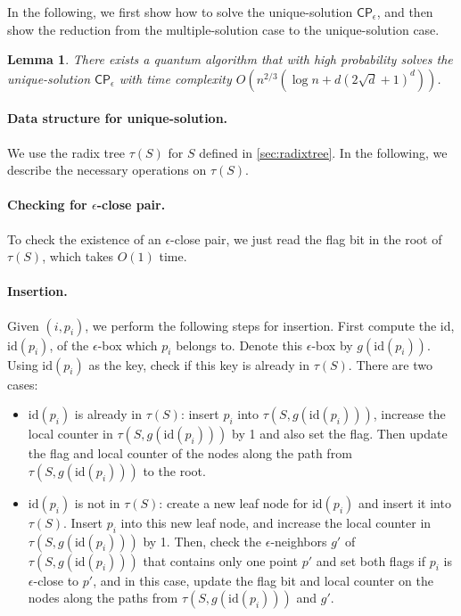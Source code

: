\documentclass[10pt,a4paper]{article}
\newtheorem{lemma}[theorem]{Lemma}
\newcommand{\id}{\mathrm{id}}
\newcommand{\eCP}{\mathsf{CP}_{\epsilon}}
\begin{document}
In the following, we first show how to solve the unique-solution $\eCP$, and then show the reduction from the multiple-solution case to the unique-solution case. 
\begin{lemma}
  \label{lem:ecp-single-solution}
  There exists a quantum algorithm that with high probability solves the unique-solution $\eCP$ with time complexity $O(n^{2/3}(\log n + d(2\sqrt{d}+1)^d))$.
\end{lemma}


\paragraph{Data structure for unique-solution.}

We use the radix tree $\tau(S)$ for $S$ defined in \cref{sec:radixtree}. In the following, we describe the necessary operations on $\tau(S)$.

\paragraph{Checking for $\epsilon$-close pair.} To check the existence of an $\epsilon$-close pair, we just read the flag bit in the root of $\tau(S)$, which takes $O(1)$ time.

\paragraph{Insertion.} Given $(i, p_i)$, we perform the following steps for insertion. First compute the id, $\id(p_i)$, of the $\epsilon$-box which $p_i$ belongs to. Denote this $\epsilon$-box by $g(\id(p_i))$. Using $\id(p_i)$ as the key, check if this key is already in $\tau(S)$. There are two cases:
\begin{itemize}
  \item $\id(p_i)$ is already in $\tau(S)$: insert $p_i$ into $\tau(S, g(\id(p_i)))$, increase the local counter in $\tau(S, g(\id(p_i)))$ by 1 and also set the flag. Then update the flag and local counter of the nodes along the path from $\tau(S, g(\id(p_i)))$ to the root. 
  \item $\id(p_i)$ is not in $\tau(S)$: create a new leaf node for $\id(p_i)$ and insert it into $\tau(S)$. Insert $p_i$ into this new leaf node, and increase the local counter in $\tau(S, g(\id(p_i)))$ by 1. Then, check the $\epsilon$-neighbors $g'$ of $\tau(S, g(\id(p_i)))$ that contains only one point $p'$ and set both flags if $p_i$ is $\epsilon$-close to $p'$, and in this case, update the flag bit and local counter on the nodes along the paths from $\tau(S, g(\id(p_i)))$ and $g'$.
\end{itemize}
\end{document}
